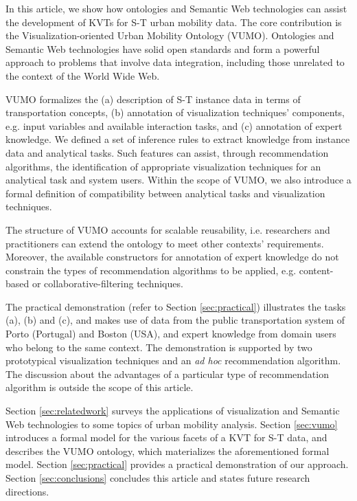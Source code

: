 In this article, we show how ontologies and Semantic Web technologies can assist the development of KVTs for S-T urban mobility data. The core contribution is the Visualization-oriented Urban Mobility Ontology (VUMO). Ontologies and Semantic Web technologies have solid open standards and form a powerful approach to problems that involve data integration, including those unrelated to the context of the World Wide Web.

VUMO formalizes the (a) description of S-T instance data in terms of transportation concepts, (b) annotation of visualization techniques' components, e.g. input variables and available interaction tasks, and (c) annotation of expert knowledge. We defined a set of inference rules to extract knowledge from instance data and analytical tasks. Such features can assist, through recommendation algorithms, the identification of appropriate visualization techniques for an analytical task and system users. Within the scope of VUMO, we also introduce a formal definition of compatibility between analytical tasks and visualization techniques.

The structure of VUMO accounts for scalable reusability, i.e. researchers and practitioners can extend the ontology to meet other contexts' requirements. Moreover, the available constructors for annotation of expert knowledge do not constrain the types of recommendation algorithms to be applied, e.g. content-based or collaborative-filtering techniques.

The practical demonstration (refer to Section \ref{sec:practical}) illustrates the tasks (a), (b) and (c), and makes use of data from the public transportation system of Porto (Portugal) and Boston (USA), and expert knowledge from domain users who belong to the same context. The demonstration is supported by two prototypical visualization techniques and an \emph{ad hoc} recommendation algorithm. The discussion about the advantages of a particular type of recommendation algorithm is outside the scope of this article.

Section \ref{sec:relatedwork} surveys the applications of visualization and Semantic Web technologies to some topics of urban mobility analysis. Section \ref{sec:vumo} introduces a formal model for the various facets of a KVT for S-T data, and describes the VUMO ontology, which materializes the aforementioned formal model. Section \ref{sec:practical} provides a practical demonstration of our approach. Section \ref{sec:conclusions} concludes this article and states future research directions.

